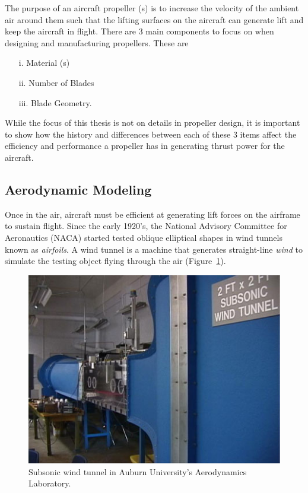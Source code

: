 \documentclass[12pt]{report}
\begin{document}
The purpose of an aircraft propeller (s) is to increase the velocity of the ambient air around them such that the lifting surfaces on the aircraft can generate lift and keep the aircraft in flight. There are 3 main components to focus on when designing and manufacturing propellers. These are
\begin{itemize}
  \item[i.] Material (s)
  \item[ii.] Number of Blades
  \item[iii.] Blade Geometry.
\end{itemize}
While the focus of this thesis is not on details in propeller design, it is important to show how the history and differences between each of these 3 items affect the efficiency and performance a propeller has in generating thrust power for the aircraft.

\clearpage
\subsection{Aerodynamic Modeling}
Once in the air, aircraft must be efficient at generating lift forces on the airframe to sustain flight. Since the early 1920's, the National Advisory Committee for Aeronautics (NACA) started tested oblique elliptical shapes in wind tunnels known as \textit{airfoils}. A wind tunnel is a machine that generates straight-line \textit{wind} to simulate the testing object flying through the air (Figure~\ref{fig:windtunnel}).

\begin{figure}[!ht]\label{fig:windtunnel}
  \centering
  \includegraphics[width=.75\linewidth]{Figures/opencircuitwindtunnel.jpg}
  \caption{Subsonic wind tunnel in Auburn University's Aerodynamics Laboratory.}
\end{figure}
\end{document}
